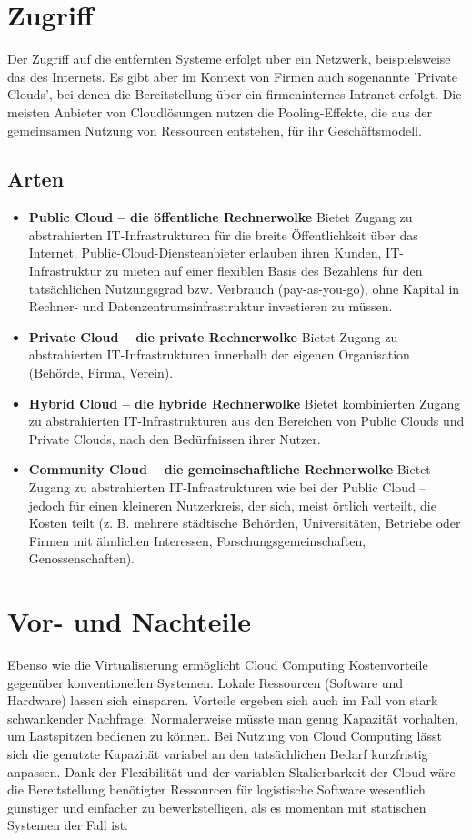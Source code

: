 \section{Zugriff}
Der Zugriff auf die entfernten Systeme erfolgt über ein Netzwerk, beispielsweise das des Internets. Es gibt aber im Kontext von Firmen auch sogenannte 'Private Clouds', bei denen die Bereitstellung über ein firmeninternes Intranet erfolgt. Die meisten Anbieter von Cloudlösungen nutzen die Pooling-Effekte, die aus der gemeinsamen Nutzung von Ressourcen entstehen, für ihr Geschäftsmodell.
\subsection{Arten}
\begin{itemize}
\item \textbf{Public Cloud – die öffentliche Rechnerwolke}
Bietet Zugang zu abstrahierten IT-Infrastrukturen für die breite Öffentlichkeit über das Internet. Public-Cloud-Diensteanbieter erlauben ihren Kunden, IT-Infrastruktur zu mieten auf einer flexiblen Basis des Bezahlens für den tatsächlichen Nutzungsgrad bzw. Verbrauch (pay-as-you-go), ohne Kapital in Rechner- und Datenzentrumsinfrastruktur investieren zu müssen.
\item \textbf{Private Cloud – die private Rechnerwolke}
Bietet Zugang zu abstrahierten IT-Infrastrukturen innerhalb der eigenen Organisation (Behörde, Firma, Verein).
\item \textbf{Hybrid Cloud – die hybride Rechnerwolke}
Bietet kombinierten Zugang zu abstrahierten IT-Infrastrukturen aus den Bereichen von Public Clouds und Private Clouds, nach den Bedürfnissen ihrer Nutzer.
\item \textbf{Community Cloud – die gemeinschaftliche Rechnerwolke}
Bietet Zugang zu abstrahierten IT-Infrastrukturen wie bei der Public Cloud – jedoch für einen kleineren Nutzerkreis, der sich, meist örtlich verteilt, die Kosten teilt (z. B. mehrere städtische Behörden, Universitäten, Betriebe oder Firmen mit ähnlichen Interessen, Forschungsgemeinschaften, Genossenschaften). 
\end{itemize}

\section{Vor- und Nachteile}
Ebenso wie die Virtualisierung ermöglicht Cloud Computing Kostenvorteile gegenüber konventionellen Systemen. Lokale Ressourcen (Software und Hardware) lassen sich einsparen. Vorteile ergeben sich auch im Fall von stark schwankender Nachfrage: Normalerweise müsste man genug Kapazität vorhalten, um Lastspitzen bedienen zu können. Bei Nutzung von Cloud Computing lässt sich die genutzte Kapazität variabel an den tatsächlichen Bedarf kurzfristig anpassen. Dank der Flexibilität und der variablen Skalierbarkeit der Cloud wäre die Bereitstellung benötigter Ressourcen für logistische Software wesentlich günstiger und einfacher zu bewerkstelligen, als es momentan mit statischen Systemen der Fall ist. 

